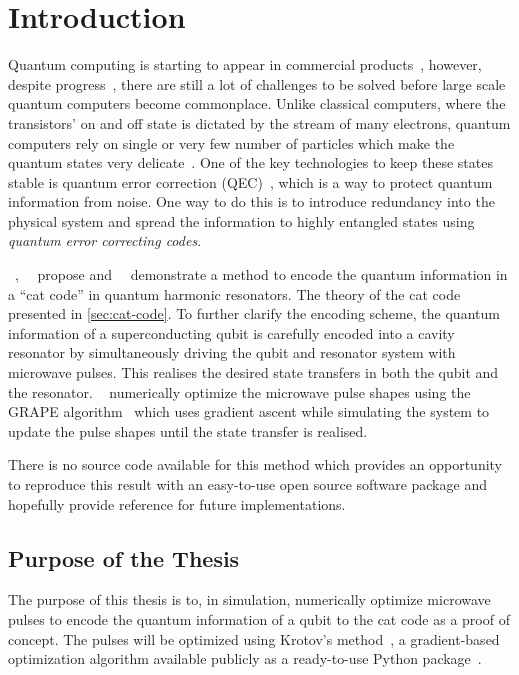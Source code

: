 \documentclass[main.tex]{subfiles}
\begin{document}
\chapter{Introduction}
Quantum computing is starting to appear in commercial products~\cite{santos_ibm_2016}, however, despite progress~\cite{preskill_quantum_2018}, there are still a lot of challenges to be solved before large scale quantum computers become commonplace.
Unlike classical computers, where the transistors' on and off state is dictated by the stream of many electrons, quantum computers rely on single or very few number of particles which make the quantum states very delicate~\cite{gottesman_introduction_2009}.
One of the key technologies to keep these states stable is quantum error correction (QEC)~\cite{gottesman_introduction_2009}, which is a way to protect quantum information from noise. One way to do this is to introduce redundancy into the physical system and spread the information to highly entangled states using \emph{quantum error correcting codes}.

\citeauthor{leghtas_hardware-efficient_2013}~\cite{leghtas_hardware-efficient_2013},~\citeauthor{mirrahimi_dynamically_2014}~\cite{mirrahimi_dynamically_2014} propose and~\citeauthor{ofek_extending_2016}~\cite{ofek_extending_2016} demonstrate a method to encode the quantum information in a ``cat code'' in quantum harmonic resonators.
The theory of the cat code presented in \cref{sec:cat-code}.
To further clarify the encoding scheme, the quantum information of a superconducting qubit is carefully encoded into a cavity resonator by simultaneously driving the qubit and resonator system with microwave pulses.
This realises the desired state transfers in both the qubit and the resonator.
~\citeauthor{ofek_extending_2016} numerically optimize the microwave pulse shapes using the GRAPE algorithm~\cite{khaneja_optimal_2005} which uses gradient ascent while simulating the system to update the pulse shapes until the state transfer is realised.

There is no source code available for this method which provides an opportunity to reproduce this result with an easy-to-use open source software package and hopefully provide reference for future implementations.

\section{Purpose of the Thesis}
The purpose of this thesis is to, in simulation, numerically optimize microwave pulses to encode the quantum information of a qubit to the cat code as a proof of concept.
The pulses will be optimized using Krotov's method~\cite{reich_monotonically_2012}, a gradient-based optimization algorithm available publicly as a ready-to-use Python package~\cite{goerz_krotov:_2019}.
\end{document}

